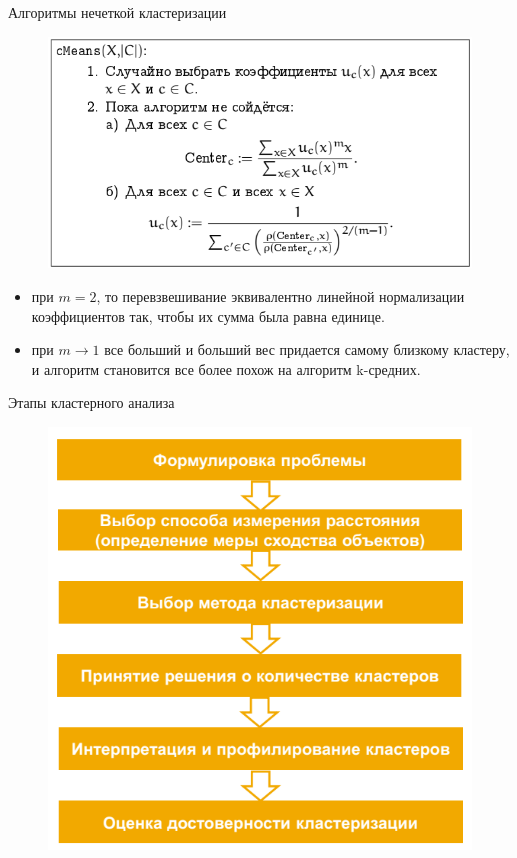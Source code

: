 \documentclass{beamer}
\begin{document}
\begin{frame}{Алгоритмы нечеткой кластеризации}
\begin{figure}[h]
\centering
\includegraphics[scale=0.5]{images/lec07-pic31.png}
\end{figure}
\begin{itemize}
\item при $m=2$, то перевзвешивание эквивалентно линейной нормализации коэффициентов так, чтобы их сумма была равна единице. 
\item при $m\rightarrow 1$ все больший и больший вес придается самому близкому кластеру, и алгоритм становится все более похож на алгоритм k-средних.
\end{itemize}
\end{frame}

\begin{frame}{Этапы кластерного анализа}
\begin{figure}[h]
\centering
\includegraphics[scale=0.5]{images/lec07-pic28.png}
\end{figure}
\end{frame}
\end{document}
